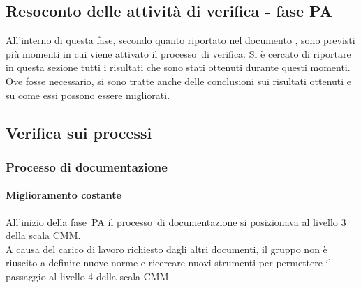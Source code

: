 \documentclass[../PianoDiQualifica.tex]{subfiles}
\begin{document}
\begin{appendices}
\section{Resoconto delle attività di verifica - fase PA}
All'interno di questa fase\g, secondo quanto riportato nel documento \pianodiprogetto, sono previsti più momenti in cui viene attivato il processo\g\ di verifica. Si è cercato di riportare in questa sezione tutti i risultati che sono stati ottenuti durante questi momenti. Ove fosse necessario, si sono tratte anche delle conclusioni sui risultati ottenuti e su come essi possono essere migliorati.
	
	\subsection{Verifica sui processi}
		\subsubsection{Processo di documentazione}
			\paragraph{Miglioramento costante}
			All'inizio della fase\g\ PA il processo\g\ di documentazione si posizionava al livello 3 della scala CMM\g.\\
			A causa del carico di lavoro richiesto dagli altri documenti, il gruppo non è riuscito a definire nuove norme e ricercare nuovi strumenti per permettere il passaggio al livello 4 della scala CMM\g.
			

\end{appendices}
\end{document}
